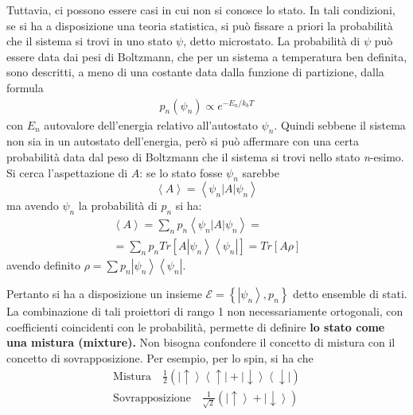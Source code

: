 Tuttavia, ci possono essere casi in cui non si conosce lo stato. In tali condizioni, se si ha a disposizione una teoria statistica, si può fissare a priori la probabilità che il sistema si trovi in uno stato $\psi$, detto microstato.
La probabilità di $\psi$ può essere data dai pesi di Boltzmann, che per un sistema a temperatura ben definita, sono descritti, a meno di una costante data dalla funzione di partizione, dalla formula
\begin{equation}\begin{split}
p_n (\psi_n) \propto e^{-E_n/k_b T}
\end{split}\end{equation}
con $E_n$ autovalore dell'energia relativo all'autostato $\psi_n$.
Quindi sebbene il sistema non sia in un autostato dell'energia, però si può affermare con una certa probabilità data dal peso di Boltzmann che il sistema si trovi nello stato \emph{n}-esimo. Si cerca l'aspettazione di $A$: se lo stato fosse $\psi _n$ sarebbe \[\left\langle A \right\rangle=\left\langle \psi _n|A|\psi _n \right\rangle\] ma avendo $\psi _n$ la probabilità di $p_n$ si ha:
\begin{equation}\begin{split}
\left\langle A \right\rangle=\sum_n{p_n\left\langle \psi _n|A|\psi _n \right\rangle}=\\
=\sum_n{p_nTr\left[A\left |\psi _n \right\rangle\left\langle \psi _n\right |\right]} = Tr\left[A\rho\right]
\end{split}\end{equation}
avendo definito $\rho=\sum{p_n\left |\psi _n \right\rangle\left\langle \psi _n\right |}$.

Pertanto si ha a disposizione un insieme $\mathcal{E} = \left\{\left |\psi _n \right\rangle,p_n\right\}$ detto ensemble di stati. La combinazione di tali proiettori di rango 1 non necessariamente ortogonali, con coefficienti coincidenti con le probabilità, permette di definire \textbf{lo stato come una mistura (mixture).} 
Non bisogna confondere il concetto di mistura con il concetto di sovrapposizione. Per esempio, per lo spin, si ha che 
\begin{equation}\begin{split}
\textrm{Mistura} \quad \frac{1}{2}\left(\left |\uparrow \right\rangle\left\langle \uparrow\right |+\left |\downarrow \right\rangle\left\langle \downarrow\right |\right)\\
\textrm{Sovrapposizione} \quad \frac{1}{\sqrt{2}}\left(\left |\uparrow \right\rangle+\left |\downarrow \right\rangle\right)\\
\end{split}\end{equation}

